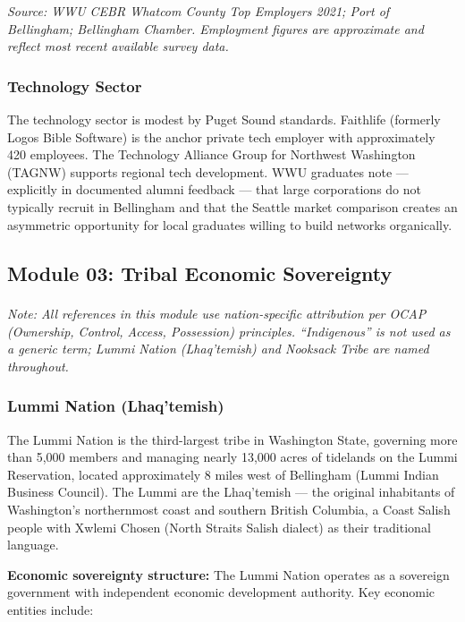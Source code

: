 \documentclass[11pt,letterpaper]{article}
\begin{document}
\textit{Source: WWU CEBR Whatcom County Top Employers 2021; Port of Bellingham; Bellingham Chamber. Employment figures are approximate and reflect most recent available survey data.}

\subsubsection{Technology Sector}

The technology sector is modest by Puget Sound standards. Faithlife (formerly Logos Bible Software) is the anchor private tech employer with approximately 420 employees. The Technology Alliance Group for Northwest Washington (TAGNW) supports regional tech development. WWU graduates note --- explicitly in documented alumni feedback --- that large corporations do not typically recruit in Bellingham and that the Seattle market comparison creates an asymmetric opportunity for local graduates willing to build networks organically.

\subsection{Module 03: Tribal Economic Sovereignty}

\textit{Note: All references in this module use nation-specific attribution per OCAP\textsuperscript{\textregistered} (Ownership, Control, Access, Possession) principles. ``Indigenous'' is not used as a generic term; Lummi Nation (Lhaq'temish) and Nooksack Tribe are named throughout.}

\subsubsection{Lummi Nation (Lhaq'temish)}

The Lummi Nation is the third-largest tribe in Washington State, governing more than 5,000 members and managing nearly 13,000 acres of tidelands on the Lummi Reservation, located approximately 8 miles west of Bellingham (Lummi Indian Business Council). The Lummi are the Lhaq'temish --- the original inhabitants of Washington's northernmost coast and southern British Columbia, a Coast Salish people with Xwlemi Chosen (North Straits Salish dialect) as their traditional language.

\textbf{Economic sovereignty structure:} The Lummi Nation operates as a sovereign government with independent economic development authority. Key economic entities include:
\end{document}
